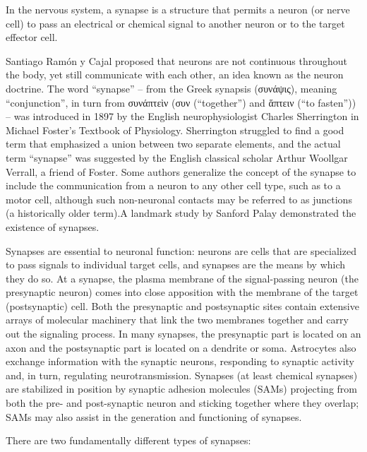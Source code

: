 In the nervous system, a synapse is a structure that permits a neuron (or nerve cell) to pass an electrical or chemical signal to another neuron or to the target effector cell.

Santiago Ramón y Cajal proposed that neurons are not continuous throughout the body, yet still communicate with each other, an idea known as the neuron doctrine. The word ``synapse'' -- from the Greek synapsis (συνάψις), meaning ``conjunction'', in turn from συνάπτεὶν (συν (``together'') and ἅπτειν (``to fasten'')) -- was introduced in 1897 by the English neurophysiologist Charles Sherrington in Michael Foster's Textbook of Physiology. Sherrington struggled to find a good term that emphasized a union between two separate elements, and the actual term ``synapse'' was suggested by the English classical scholar Arthur Woollgar Verrall, a friend of Foster. Some authors generalize the concept of the synapse to include the communication from a neuron to any other cell type, such as to a motor cell, although such non-neuronal contacts may be referred to as junctions (a historically older term).A landmark study by Sanford Palay demonstrated the existence of synapses.

Synapses are essential to neuronal function: neurons are cells that are specialized to pass signals to individual target cells, and synapses are the means by which they do so. At a synapse, the plasma membrane of the signal-passing neuron (the presynaptic neuron) comes into close apposition with the membrane of the target (postsynaptic) cell. Both the presynaptic and postsynaptic sites contain extensive arrays of molecular machinery that link the two membranes together and carry out the signaling process. In many synapses, the presynaptic part is located on an axon and the postsynaptic part is located on a dendrite or soma. Astrocytes also exchange information with the synaptic neurons, responding to synaptic activity and, in turn, regulating neurotransmission. Synapses (at least chemical synapses) are stabilized in position by synaptic adhesion molecules (SAMs) projecting from both the pre- and post-synaptic neuron and sticking together where they overlap; SAMs may also assist in the generation and functioning of synapses.

There are two fundamentally different types of synapses:

